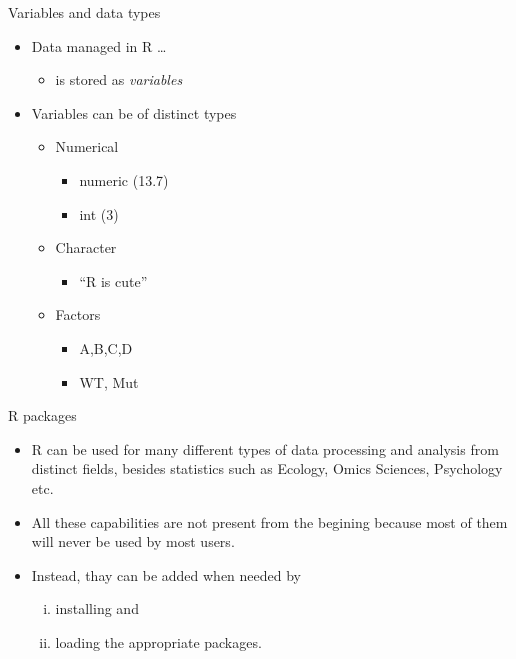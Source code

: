 \documentclass[
  ignorenonframetext,
]{beamer}
\providecommand{\tightlist}{%
  \setlength{\itemsep}{0pt}\setlength{\parskip}{0pt}}
\begin{document}
\begin{frame}{Variables and data types}
\protect\hypertarget{variables-and-data-types}{}
\begin{itemize}
\tightlist
\item
  Data managed in R \ldots{}

  \begin{itemize}
  \tightlist
  \item
    is stored as \emph{variables}
  \end{itemize}
\item
  Variables can be of distinct types

  \begin{itemize}
  \tightlist
  \item
    Numerical

    \begin{itemize}
    \tightlist
    \item
      numeric (13.7)
    \item
      int (3)
    \end{itemize}
  \item
    Character

    \begin{itemize}
    \tightlist
    \item
      ``R is cute''
    \end{itemize}
  \item
    Factors

    \begin{itemize}
    \tightlist
    \item
      A,B,C,D
    \item
      WT, Mut
    \end{itemize}
  \end{itemize}
\end{itemize}
\end{frame}

\begin{frame}{R packages}
\protect\hypertarget{r-packages}{}
\begin{itemize}
\tightlist
\item
  R can be used for many different types of data processing and analysis
  from distinct fields, besides statistics such as Ecology, Omics
  Sciences, Psychology etc.
\item
  All these capabilities are not present from the begining because most
  of them will never be used by most users.
\item
  Instead, thay can be added when needed by

  \begin{enumerate}
  [(i)]
  \tightlist
  \item
    installing and
  \item
    loading the appropriate packages.
  \end{enumerate}
\end{itemize}
\end{frame}
\end{document}
